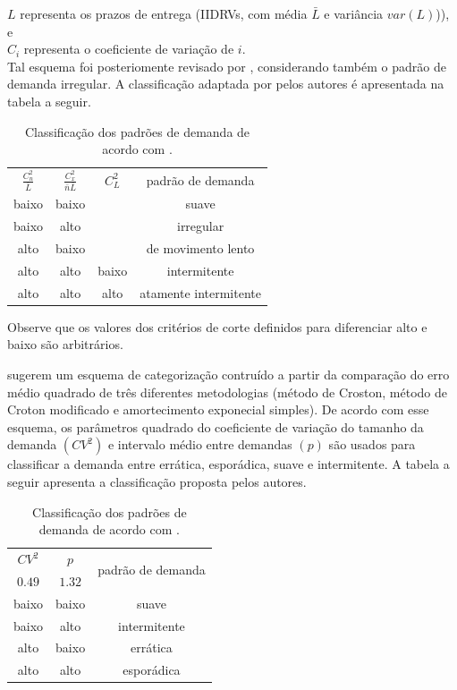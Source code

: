 \documentclass[11pt,letterpaper,twocolumn]{article}
\begin{document}
$L$ representa os prazos de entrega (IIDRVs, com média $\bar{L}$ e variância $var(L)$)), e \\

$C_{i}$ representa o coeficiente de variação de $i$. \\

Tal esquema foi posteriomente revisado por \cite{EavesKingsman2004}, considerando também o padrão de demanda irregular. A classificação adaptada por pelos autores é apresentada na tabela a seguir.

\begin{table}[h]
\begin{center}
\begin{tabular}[c]{c c c c}
\cline {1-4}
$\frac{C_{n}^{2}}{\bar{L}}$ & $\frac{C_{x}^{2}}{\bar{n}\bar{L}}$ & $C_{L}^{2}$ & padrão de demanda \\ \cline {1-4}
baixo & baixo &  & suave   \\ 
baixo & alto  &  & irregular   \\ 
alto  & baixo &  & de movimento lento   \\
alto  & alto  & baixo & intermitente   \\
alto  & alto  & alto  & atamente intermitente\\ \cline {1-4}
\end{tabular}
\label{tab:DemandPattern}
\caption{Classificação dos padrões de demanda de acordo com \cite{EavesKingsman2004}.}
\end{center}
\end{table}

Observe que os valores dos critérios de corte definidos para diferenciar alto e baixo são arbitrários.

\cite{SyntetosEtAl2005} sugerem um esquema de categorização contruído a partir da comparação do erro médio quadrado de três diferentes metodologias (método de Croston, método de Croton modificado e amortecimento exponecial simples). De acordo com esse esquema, os parâmetros quadrado do coeficiente de variação do tamanho da demanda $(CV^2)$ e intervalo médio entre demandas $(p)$ são usados para classificar a demanda entre errática, esporádica, suave e intermitente. A tabela a seguir apresenta a classificação proposta pelos autores.

\begin{table}[h]
\begin{center}
\begin{tabular}[c]{c c c}
\cline {1-3}
$CV^2$ & $p$ & \multirow{2}{*}{padrão de demanda} \\ 
$0.49$ & $1.32$ & \\ \cline {1-3}
baixo & baixo & suave   \\ 
baixo & alto  & intermitente   \\ 
alto  & baixo & errática   \\
alto  & alto  & esporádica  \\ \cline {1-3}
\end{tabular}
\label{tab:DemandPatternSybtetos}
\caption{Classificação dos padrões de demanda de acordo com \cite{SyntetosEtAl2005}.}
\end{center}
\end{table}
\end{document}
